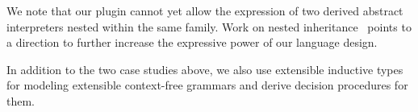 We note that our plugin cannot yet allow the expression of two derived abstract
interpreters nested within the same family.
Work on nested inheritance~\cite{ncm2004,zm2017} points to a direction
to further increase the expressive power of our language design.

In addition to the two case studies above, we also use extensible
inductive types for modeling extensible context-free grammars and derive
decision procedures for them.

